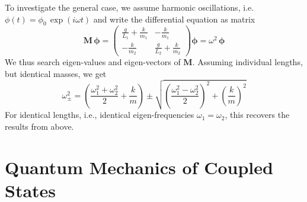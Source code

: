 To investigate the general case, we assume harmonic oscillations, i.e. $\phi(t) = \phi_0 \, \exp (i \omega t)$ and write the differential equation as matrix
\[ \boldsymbol{M \, \phi}	 = 
\begin{pmatrix}
  \frac{g}{L_1} +  \frac{k}{m_1}&  - \frac{k}{m_1}\\
 - \frac{k}{m_2} &  \frac{g}{L_2} +  \frac{k}{m_2}
\end{pmatrix}  \boldsymbol{\phi}	= \omega^2   \, \boldsymbol{\phi}
\]
We thus search eigen-values and eigen-vectors of  $\boldsymbol{M}$. Assuming individual lengths, but identical masses, we get
\[
 \omega_{\pm}^2 = \left( \frac{\omega_1^2 + \omega_2^2}{2}  + \frac{k}{m} \right)
  \pm \sqrt{  \left( \frac{\omega_1^2 - \omega_2^2}{2}   \right)^2 + \left(  \frac{k}{m} \right)^2 }
\]
For identical lengths, i.e., identical eigen-frequencies $\omega_1 = \omega_2$, this recovers the results from above.


\section{Quantum Mechanics of Coupled States}

